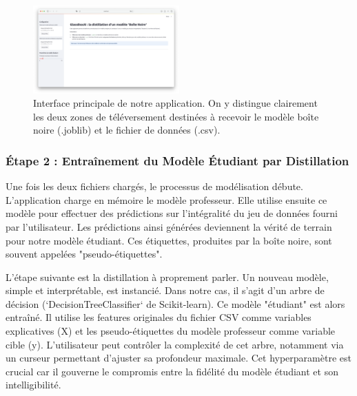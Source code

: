 \documentclass{article}
\begin{document}
\begin{figure}[h]
    \centering
    \includegraphics[width=0.5\textwidth]{app_start.png}
    \caption{Interface principale de notre application. On y distingue clairement les deux zones de téléversement destinées à recevoir le modèle boîte noire (.joblib) et le fichier de données (.csv).}
    \label{fig:upload_interface}
\end{figure}



\subsubsection{Étape 2 : Entraînement du Modèle Étudiant par Distillation}

\quad Une fois les deux fichiers chargés, le processus de modélisation débute. L'application charge en mémoire le modèle professeur. Elle utilise ensuite ce modèle pour effectuer des prédictions sur l'intégralité du jeu de données fourni par l'utilisateur. Les prédictions ainsi générées deviennent la vérité de terrain pour notre modèle étudiant. Ces étiquettes, produites par la boîte noire, sont souvent appelées "pseudo-étiquettes".

L'étape suivante est la distillation à proprement parler. Un nouveau modèle, simple et interprétable, est instancié. Dans notre cas, il s'agit d'un arbre de décision (`DecisionTreeClassifier` de Scikit-learn). Ce modèle "étudiant" est alors entraîné. Il utilise les features originales du fichier CSV comme variables explicatives (X) et les pseudo-étiquettes du modèle professeur comme variable cible (y). L'utilisateur peut contrôler la complexité de cet arbre, notamment via un curseur permettant d'ajuster sa profondeur maximale. Cet hyperparamètre est crucial car il gouverne le compromis entre la fidélité du modèle étudiant et son intelligibilité.
\end{document}
